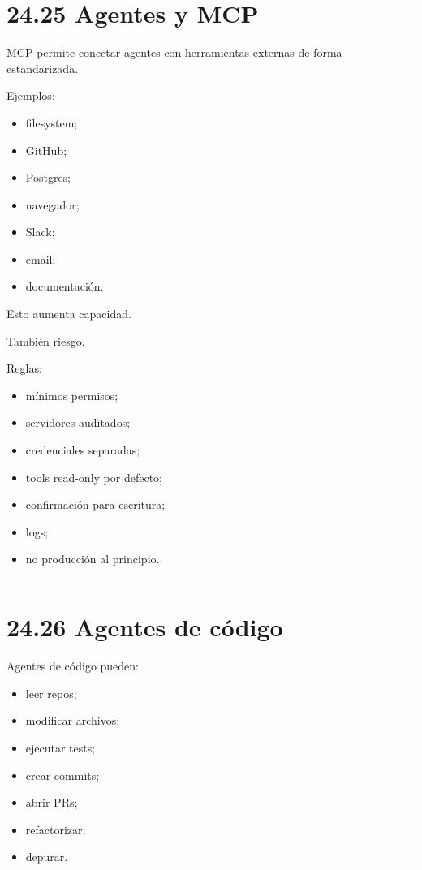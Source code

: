 \section{24.25 Agentes y MCP}\label{agentes-y-mcp}

MCP permite conectar agentes con herramientas externas de forma
estandarizada.

Ejemplos:

\begin{itemize}
\tightlist
\item
  filesystem;
\item
  GitHub;
\item
  Postgres;
\item
  navegador;
\item
  Slack;
\item
  email;
\item
  documentación.
\end{itemize}

Esto aumenta capacidad.

También riesgo.

Reglas:

\begin{itemize}
\tightlist
\item
  mínimos permisos;
\item
  servidores auditados;
\item
  credenciales separadas;
\item
  tools read-only por defecto;
\item
  confirmación para escritura;
\item
  logs;
\item
  no producción al principio.
\end{itemize}

\begin{center}\rule{0.5\linewidth}{0.5pt}\end{center}

\section{24.26 Agentes de código}\label{agentes-de-cuxf3digo}

Agentes de código pueden:

\begin{itemize}
\tightlist
\item
  leer repos;
\item
  modificar archivos;
\item
  ejecutar tests;
\item
  crear commits;
\item
  abrir PRs;
\item
  refactorizar;
\item
  depurar.
\end{itemize}

